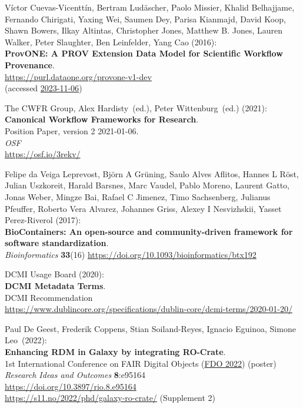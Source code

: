 \begin{thebibliography}{9}
Víctor Cuevas-Vicenttín, Bertram Ludäscher, Paolo Missier, Khalid Belhajjame, Fernando Chirigati, Yaxing Wei, Saumen Dey, Parisa Kianmajd, David Koop, Shawn Bowers, Ilkay Altintas, Christopher Jones, Matthew B. Jones, Lauren Walker, Peter Slaughter, Ben Leinfelder, Yang Cao (2016):\\
\textbf{ProvONE: A PROV Extension Data Model for Scientific Workflow Provenance}.\\
\url{https://purl.dataone.org/provone-v1-dev}\\
(accessed \href{https://web.archive.org/web/20231106005203/http://jenkins-1.dataone.org/jenkins/view/Documentation%20Projects/job/ProvONE-Documentation-trunk/ws/provenance/ProvONE/v1/provone.html}{2023-11-06})

The CWFR Group, Alex Hardisty~(ed.), Peter Wittenburg~(ed.) (2021):\\
\textbf{Canonical Workflow Frameworks for Research}.\\
Position Paper, version 2 2021-01-06. \\
\emph{OSF} \\
\url{https://osf.io/3rekv/}

Felipe da Veiga Leprevost, Björn A Grüning, Saulo Alves Aflitos, Hannes L Röst, Julian Uszkoreit, Harald Barsnes, Marc Vaudel, Pablo Moreno, Laurent Gatto, Jonas Weber, Mingze Bai, Rafael C Jimenez, Timo Sachsenberg, Julianus Pfeuffer, Roberto Vera Alvarez, Johannes Griss, Alexey I Nesvizhskii, Yasset Perez-Riverol (2017):\\
\textbf{BioContainers: An open-source and community-driven framework for software standardization}.\\
\emph{Bioinformatics} \textbf{33}(16) 
\url{https://doi.org/10.1093/bioinformatics/btx192}

DCMI Usage Board (2020): \\
\textbf{DCMI Metadata Terms}. \\
DCMI Recommendation\\
\url{https://www.dublincore.org/specifications/dublin-core/dcmi-terms/2020-01-20/}

Paul De Geest, Frederik Coppens, Stian
Soiland-Reyes, Ignacio Eguinoa, Simone Leo~(2022):\\
\textbf{Enhancing RDM in Galaxy by integrating RO-Crate}.\\
1st International Conference on FAIR Digital Objects
(\href{https://www.fdo2022.org/}{FDO 2022}) (poster)\\
\emph{Research Ideas and Outcomes} \textbf{8}:e95164\\
\url{https://doi.org/10.3897/rio.8.e95164}\\
\url{https://s11.no/2022/phd/galaxy-ro-crate/} (Supplement 2)


\end{thebibliography}
